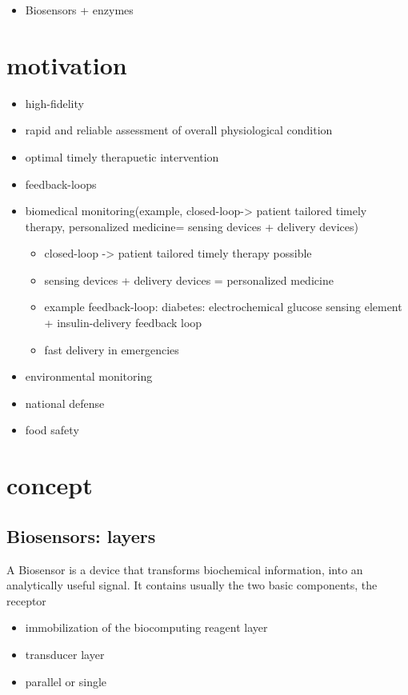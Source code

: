 \documentclass[runningheads]{llncs}
\begin{document}
	\begin{itemize}
		\item Biosensors + enzymes
	\end{itemize}


\section{motivation}
\begin{itemize}
	\item high-fidelity
	\item rapid and reliable assessment of overall physiological condition
	\item optimal timely therapuetic intervention
	\item feedback-loops
		\item biomedical monitoring(example, closed-loop-> patient tailored timely therapy, personalized medicine= sensing devices + delivery devices)
		\begin{itemize}
			\item closed-loop -> patient tailored timely therapy possible
			\item sensing devices + delivery devices = personalized medicine
			\item example feedback-loop: diabetes: electrochemical glucose sensing element + insulin-delivery feedback loop
			\item fast delivery in emergencies 
		\end{itemize}
		\item environmental monitoring
		\item national defense
		\item food safety
		\\
		
	
\end{itemize}


\section{concept}
\subsection{Biosensors: layers}
	A Biosensor is a device that transforms biochemical information, into an analytically useful signal. It contains usually the two basic components, the receptor
	\begin{itemize}
		\item immobilization of the biocomputing reagent layer
		\item transducer layer
		\item parallel or single
		
		
	\end{itemize}
\end{document}
